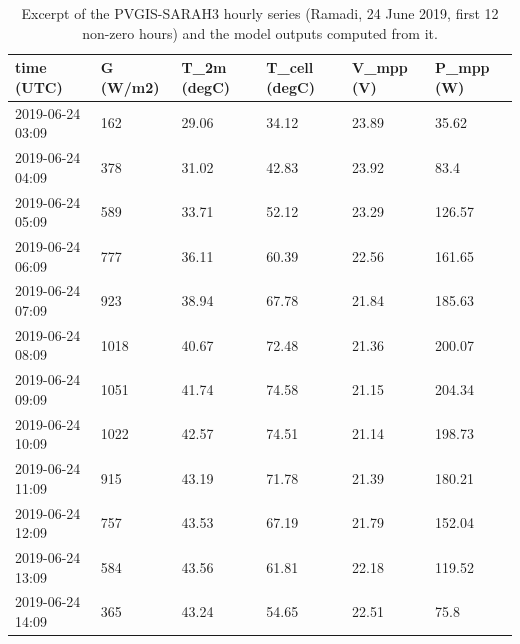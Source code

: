 \begin{table}[t]
\centering
\caption{Excerpt of the PVGIS-SARAH3 hourly series (Ramadi, 24 June 2019, first 12 non-zero hours) and the model outputs computed from it.}
\label{tab:Table_Dataset_Excerpt_PVGIS}
\small
\begin{tabular}{llllll}
\hline
time (UTC) & G (W/m2) & T\_2m (degC) & T\_cell (degC) & V\_mpp (V) & P\_mpp (W) \\
\hline
2019-06-24 03:09 & 162 & 29.06 & 34.12 & 23.89 & 35.62 \\
2019-06-24 04:09 & 378 & 31.02 & 42.83 & 23.92 & 83.4 \\
2019-06-24 05:09 & 589 & 33.71 & 52.12 & 23.29 & 126.57 \\
2019-06-24 06:09 & 777 & 36.11 & 60.39 & 22.56 & 161.65 \\
2019-06-24 07:09 & 923 & 38.94 & 67.78 & 21.84 & 185.63 \\
2019-06-24 08:09 & 1018 & 40.67 & 72.48 & 21.36 & 200.07 \\
2019-06-24 09:09 & 1051 & 41.74 & 74.58 & 21.15 & 204.34 \\
2019-06-24 10:09 & 1022 & 42.57 & 74.51 & 21.14 & 198.73 \\
2019-06-24 11:09 & 915 & 43.19 & 71.78 & 21.39 & 180.21 \\
2019-06-24 12:09 & 757 & 43.53 & 67.19 & 21.79 & 152.04 \\
2019-06-24 13:09 & 584 & 43.56 & 61.81 & 22.18 & 119.52 \\
2019-06-24 14:09 & 365 & 43.24 & 54.65 & 22.51 & 75.8 \\
\hline
\end{tabular}
\end{table}
